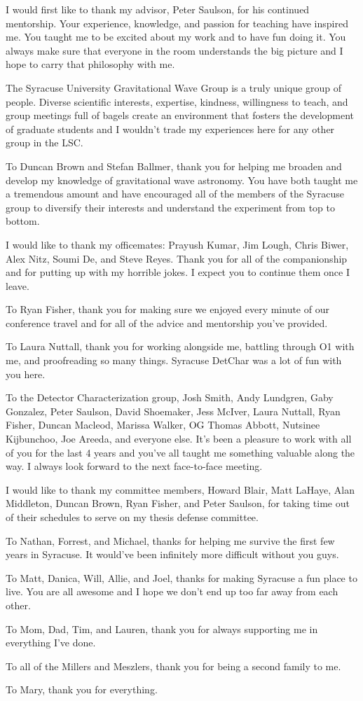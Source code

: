 I would first like to thank my advisor, Peter Saulson, for his continued mentorship. Your experience, knowledge, 
and passion for teaching have inspired me. You taught me to be excited about my work and to have fun doing it. 
You always make sure that everyone in the room understands the big picture and I hope to carry that philosophy with me. 

The Syracuse University Gravitational Wave Group is a truly unique group of people. Diverse scientific interests, 
expertise, kindness, willingness to teach, and group meetings full of bagels create an environment that fosters 
the development of graduate students and I wouldn't trade my experiences here for any other group in the LSC. 

To Duncan Brown and Stefan Ballmer, thank you for helping me broaden and develop my knowledge of gravitational 
wave astronomy. You have both taught me a tremendous amount and have encouraged all of the members of the Syracuse 
group to diversify their interests and understand the experiment from top to bottom.  

I would like to thank my officemates: Prayush Kumar, Jim Lough, Chris Biwer, Alex Nitz, Soumi De, and Steve Reyes. 
Thank you for all of the companionship and for putting up with my horrible jokes. I expect you to continue them 
once I leave.

To Ryan Fisher, thank you for making sure we enjoyed every minute of our conference travel and for all of the 
advice and mentorship you've provided. 

To Laura Nuttall, thank you for working alongside me, battling through O1 with me, and proofreading so many 
things. Syracuse DetChar was a lot of fun with you here.

To the Detector Characterization group, Josh Smith, Andy Lundgren, Gaby Gonzalez, Peter Saulson, David Shoemaker, 
Jess McIver, Laura Nuttall, Ryan Fisher, Duncan Macleod, Marissa Walker, 
OG Thomas Abbott, Nutsinee Kijbunchoo, Joe Areeda, and everyone else. It's been a pleasure to work with all of you 
for the last 4 years and you've 
all taught me something valuable along the way. I always look forward to the next face-to-face meeting.

I would like to thank my committee members, Howard Blair, Matt LaHaye, Alan Middleton, Duncan Brown, Ryan Fisher, 
and Peter Saulson, for taking time out of their schedules to serve on my thesis defense committee.

To Nathan, Forrest, and Michael, thanks for helping me survive the first few years in Syracuse. It would've been 
infinitely more difficult without you guys. 

To Matt, Danica, Will, Allie, and Joel, thanks for making Syracuse a fun place to live. You are all awesome and 
I hope we don't end up too far away from each other. 

To Mom, Dad, Tim, and Lauren, thank you for always supporting me in everything I've done. 

To all of the Millers and Meszlers, thank you for being a second family to me.  

To Mary, thank you for everything.
